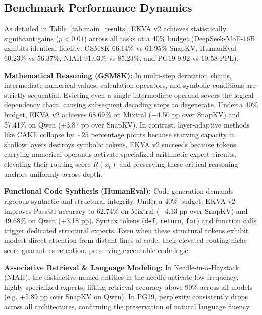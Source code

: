 \documentclass[conference]{IEEEtran}
\begin{document}
\subsection{Benchmark Performance Dynamics}
As detailed in Table~\ref{tab:main_results}, EKVA v2 achieves statistically significant gains ($p < 0.01$) across all tasks at a 40\% budget (DeepSeek-MoE-16B exhibits identical fidelity: GSM8K 66.14\% vs 61.95\% SnapKV, HumanEval 60.23\% vs 56.37\%, NIAH 91.03\% vs 85.23\%, and PG19 9.92 vs 10.58 PPL).

\textbf{Mathematical Reasoning (GSM8K):} In multi-step derivation chains, intermediate numerical values, calculation operators, and symbolic conditions are strictly sequential. Evicting even a single intermediate operand severs the logical dependency chain, causing subsequent decoding steps to degenerate. Under a 40\% budget, EKVA v2 achieves 68.69\% on Mixtral (+4.50 pp over SnapKV) and 57.41\% on Qwen (+3.87 pp over SnapKV). In contrast, layer-adaptive methods like CAKE collapse by $\sim 25$ percentage points because starving capacity in shallow layers destroys symbolic tokens. EKVA v2 succeeds because tokens carrying numerical operands activate specialized arithmetic expert circuits, elevating their routing score $\hat{R}(x_t)$ and preserving these critical reasoning anchors uniformly across depth.

\textbf{Functional Code Synthesis (HumanEval):} Code generation demands rigorous syntactic and structural integrity. Under a 40\% budget, EKVA v2 improves Pass@1 accuracy to 62.74\% on Mixtral (+4.13 pp over SnapKV) and 49.68\% on Qwen (+3.18 pp). Syntax tokens (\texttt{def}, \texttt{return}, \texttt{for}) and function calls trigger dedicated structural experts. Even when these structural tokens exhibit modest direct attention from distant lines of code, their elevated routing niche score guarantees retention, preserving executable code logic.

\textbf{Associative Retrieval \& Language Modeling:} In Needle-in-a-Haystack (NIAH), the distinctive named entities in the needle activate low-frequency, highly specialized experts, lifting retrieval accuracy above 90\% across all models (e.g. +5.89 pp over SnapKV on Qwen). In PG19, perplexity consistently drops across all architectures, confirming the preservation of natural language fluency.
\end{document}

